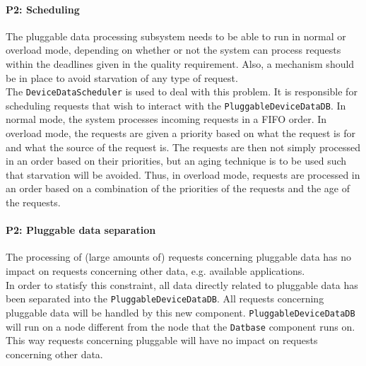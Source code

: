     \paragraph{P2: Scheduling}
        The pluggable data processing subsystem needs to be able to run in normal
        or overload mode, depending on whether or not the system can process
        requests within the deadlines given in the quality requirement. Also,
        a mechanism should be in place to avoid starvation of any type of request. \\
        The \texttt{DeviceDataScheduler} is used to deal with this problem.
        It is responsible for scheduling requests that wish to interact with
        the \texttt{PluggableDeviceDataDB}. In normal mode, the system processes
        incoming requests in a FIFO order. In overload mode, the requests are
        given a priority based on what the request is for and what the source
        of the request is. The requests are then not simply processed in an
        order based on their priorities, but an aging technique is to be used
        such that starvation will be avoided. Thus, in overload mode,
        requests are processed in an order based on a combination of the
        priorities of the requests and the age of the requests.

    \paragraph{P2: Pluggable data separation}
        The processing of (large amounts of) requests concerning pluggable
        data has no impact on requests concerning other data, e.g. available applications. \\
        In order to statisfy this constraint, all data directly related to
        pluggable data has been separated into the \texttt{PluggableDeviceDataDB}.
        All requests concerning pluggable data will be handled by this new
        component. \texttt{PluggableDeviceDataDB} will run on a node different
        from the node that the \texttt{Datbase} component runs on. This way
        requests concerning pluggable will have no impact on
        requests concerning other data.

